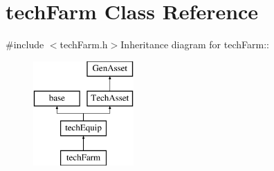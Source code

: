 \hypertarget{classtech_farm}{
\section{techFarm Class Reference}
\label{classtech_farm}
}


{\ttfamily \#include $<$techFarm.h$>$}Inheritance diagram for techFarm::\begin{figure}[H]
\begin{center}
\leavevmode
\includegraphics[height=4cm]{classtech_farm}
\end{center}
\end{figure}
